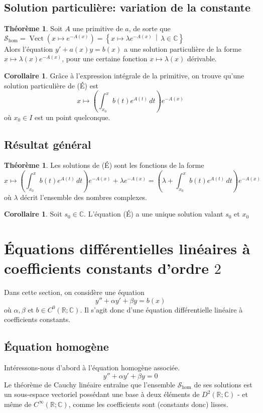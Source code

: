 \documentclass[10pt,a4paper]{article}
\theoremstyle{definition}
\newtheorem{theorem}[proposition]{Théorème}
\newtheorem{corollaire}[proposition]{Corollaire}
\DeclareMathOperator{\vect}{Vect}
\begin{document}
\subsection{Solution particulière: variation de la constante}
\begin{theorem}
Soit $A$ une primitive de $a$, de sorte que $\mathcal{S}_\text{hom} = \vect\left( x \mapsto e^{-A(x)} \right) = \left\{ x \mapsto \lambda e^{-A(x)} \, \middle| \, \lambda \in \mathbb{C} \right\}$ \\
Alors l'équation $y' + a(x)y = b(x)$ a une solution particulière de la forme $x \mapsto \lambda(x)e^{-A(x)}$, pour une certaine fonction $x \mapsto \lambda(x)$ dérivable.
\end{theorem}
\begin{corollaire}
Grâce à l'expression intégrale de la primitive, on trouve qu'une solution particulière de (É) est
\[ x \mapsto \left(\int_{x_0}^x b(t)e^{A(t)} \, dt \right) e^{-A(x)} \]
où $x_0 \in I$ est un point quelconque.
\end{corollaire}

\subsection{Résultat général}
\begin{theorem}
Les solutions de (É) sont les fonctions de la forme
\[ x \mapsto \left( \int_{x_0}^x b(t) e^{A(t)} \, dt \right) e^{-A(x)} + \lambda e^{-A(x)} = \left( \lambda + \int_{x_0}^x b(t) e^{A(t)} \, dt \right) e^{-A(x)} \]
où $\lambda$ décrit l'ensemble des nombres complexes.
\end{theorem}
\begin{corollaire}
Soit $s_0 \in \mathbb{C}$. L'équation (É) a une unique solution valant $s_0$ et $x_0$
\end{corollaire}

\section{Équations différentielles linéaires à coefficients constants d'ordre $2$}
\noindent Dans cette section, on considère une équation
\[ y'' + \alpha y' + \beta y = b(x) \tag{É} \]
où $\alpha, \beta$ et $b \in C^0(\mathbb{R}; \mathbb{C})$. Il s'agit donc d'une équation différentielle linéaire à coefficients constants.

\pagebreak

\subsection{Équation homogène}
\noindent Intéressons-nous d'abord à l'équation homogène associée.
\[ y'' + \alpha y' + \beta y = 0 \tag{Éh} \]
Le théorème de Cauchy linéaire entraîne que l'ensemble $\mathcal{S}_\text{hom}$ de ses solutions est un sous-espace vectoriel possédant une base à deux éléments de $D^2(\mathbb{R}; \mathbb{C})$ - et même de $C^\infty(\mathbb{R}; \mathbb{C})$, comme les coefficients sont (constants donc) lisses. \medskip
\end{document}
